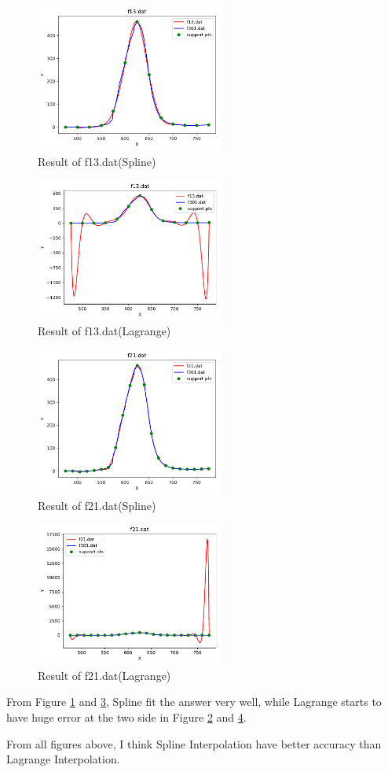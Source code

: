 \documentclass{article}
\begin{document}
\begin{figure}[H]
    \centering
    \includegraphics[width=0.55\textwidth]{src/f13.pdf}
    \caption{Result of f13.dat(Spline)}
    \label{fig:f13}
\end{figure}
\begin{figure}[H]
    \centering
    \includegraphics[width=0.55\textwidth]{src/f13_l.pdf}
    \caption{Result of f13.dat(Lagrange)}
    \label{fig:f13l}
\end{figure}
\begin{figure}[H]
    \centering
    \includegraphics[width=0.55\textwidth]{src/f21.pdf}
    \caption{Result of f21.dat(Spline)}
    \label{fig:f21}
\end{figure}
\begin{figure}[H]
    \centering
    \includegraphics[width=0.55\textwidth]{src/f21_l.pdf}
    \caption{Result of f21.dat(Lagrange)}
    \label{fig:f21l}
\end{figure}
From Figure \ref{fig:f13} and \ref{fig:f21}, Spline fit the answer very well, while Lagrange starts to have huge error at the two side in
Figure \ref{fig:f13l} and \ref{fig:f21l}.

From all figures above, I think Spline Interpolation have better accuracy than Lagrange Interpolation.
\end{document}

